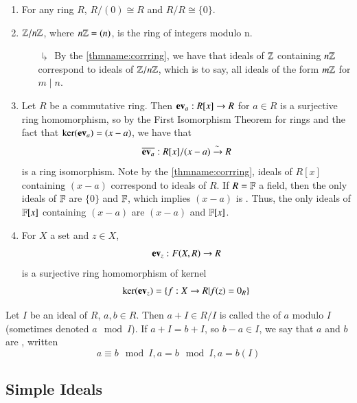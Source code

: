 \documentclass[12pt, a4paper, oneside, openright, titlepage]{book}
\begin{document}
\begin{eg}
    \leavevmode
    \begin{enumerate}
        \item For any ring $R$, $R/(0) \cong R$ and $R/R \cong \{0\}$.
        \item $\mathbb Z/n\mathbb Z$, where $n\mathbb Z = (n)$, is the ring of integers modulo n.
        \begin{enumerate}
            \item[$\drsh$] By the \ref{thmname:corrring}, we have that ideals of $\mathbb Z$ containing $n\mathbb Z$ correspond to ideals of $\mathbb Z/n\mathbb Z$, which is to say, all ideals of the form $m\mathbb Z$ for $m \;\vert\;n$.
        \end{enumerate}
        \item Let $R$ be a commutative ring. Then $\operatorname{\bf{ev}}_a:R[x]\rightarrow R$ for $a \in R$ is a surjective ring homomorphism, so by the First Isomorphism Theorem for rings and the fact that $\ker(\operatorname{\bf{ev}}_a) = (x-a)$, we have that \begin{equation}
            \overline{\operatorname{\bf{ev}}_a}: R[x]/(x-a) \xrightarrow{\sim} R
        \end{equation}
        is a ring isomorphism. Note by the \ref{thmname:corrring}, ideals of $R[x]$ containing $(x-a)$ correspond to ideals of $R$. If $R = \mathbb F$ a field, then the only ideals of $\mathbb F$ are $\{0\}$ and $\mathbb F$, which implies $(x-a)$ is . Thus, the only ideals of $\mathbb F[x]$ containing $(x-a)$ are $(x-a)$ and $\mathbb F[x]$.
        \item For $X$ a set and $z \in X$, $$\operatorname{\bf{ev}}_z:F(X,R) \rightarrow R$$
        is a surjective ring homomorphism of kernel $$\ker(\operatorname{\bf{ev}}_z) = \{f:X\rightarrow R\vert f(z) = 0_R\}$$
    \end{enumerate}
\end{eg}

\begin{defn}
    Let $I$ be an ideal of $R$, $a,b \in R$. Then $a + I \in R/I$ is called the  of $a$ modulo $I$ (sometimes denoted $a \mod I$). If $a + I = b + I$, so $b - a \in I$, we say that $a$ and $b$ are , written \begin{equation}
        a \equiv b \mod I, a = b \mod I, a = b (I)
    \end{equation}
\end{defn}

\subsection{\textsection Simple Ideals}
\end{document}
